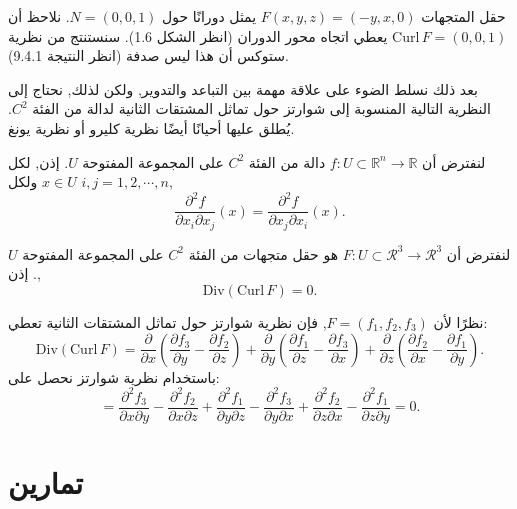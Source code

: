 \begin{exemple}
حقل المتجهات \( F(x, y, z) = (-y, x, 0) \) يمثل دورانًا حول \( N = (0, 0, 1) \). نلاحظ أن 
\( \text{Curl} \, F = (0, 0, 1) \) يعطي اتجاه محور الدوران (انظر الشكل 1.6). سنستنتج من نظرية ستوكس أن هذا ليس صدفة (انظر النتيجة 9.4.1).
\end{exemple}

بعد ذلك نسلط الضوء على علاقة مهمة بين التباعد والتدوير, ولكن لذلك, نحتاج إلى النظرية التالية المنسوبة إلى شوارتز حول تماثل المشتقات الثانية لدالة من الفئة \( C^2 \). يُطلق عليها أحيانًا أيضًا نظرية كليرو أو نظرية يونغ.

\begin{theoreme}
لنفترض أن \( f : U \subset \mathbb{R}^n \to \mathbb{R} \) دالة من الفئة \( C^2 \) على المجموعة المفتوحة \( U \). إذن, لكل \( x \in U \) ولكل \( i, j = 1, 2, \cdots, n \),
\[ 
\frac{\partial^2 f}{\partial x_i \partial x_j} (x) = \frac{\partial^2 f}{\partial x_j \partial x_i} (x). 
\]
\end{theoreme}

\begin{theoreme}

لنفترض أن \( F : U \subset \mathcal{R}^3 \to \mathcal{R}^3 \) هو حقل متجهات من الفئة \( C^2 \) على المجموعة المفتوحة \( U \). إذن,
\[
\text{Div} (\text{Curl} \, F) = 0.
\]
\end{theoreme}
\begin{demonstration}

نظرًا لأن \( F = (f_1, f_2, f_3) \), فإن نظرية شوارتز حول تماثل المشتقات الثانية تعطي:
\[ \text{Div} (\text{Curl} \, F) = \frac{\partial}{\partial x} \left( \frac{\partial f_3}{\partial y} - \frac{\partial f_2}{\partial z} \right) + \frac{\partial}{\partial y} \left( \frac{\partial f_1}{\partial z} - \frac{\partial f_3}{\partial x} \right) + \frac{\partial}{\partial z} \left( \frac{\partial f_2}{\partial x} - \frac{\partial f_1}{\partial y} \right). \]
باستخدام نظرية شوارتز نحصل على:
\[ = \frac{\partial^2 f_3}{\partial x \partial y} - \frac{\partial^2 f_2}{\partial x \partial z} + \frac{\partial^2 f_1}{\partial y \partial z} - \frac{\partial^2 f_3}{\partial y \partial x} + \frac{\partial^2 f_2}{\partial z \partial x} - \frac{\partial^2 f_1}{\partial z \partial y} = 0. \]
\end{demonstration}

    
\section{تمارين}

